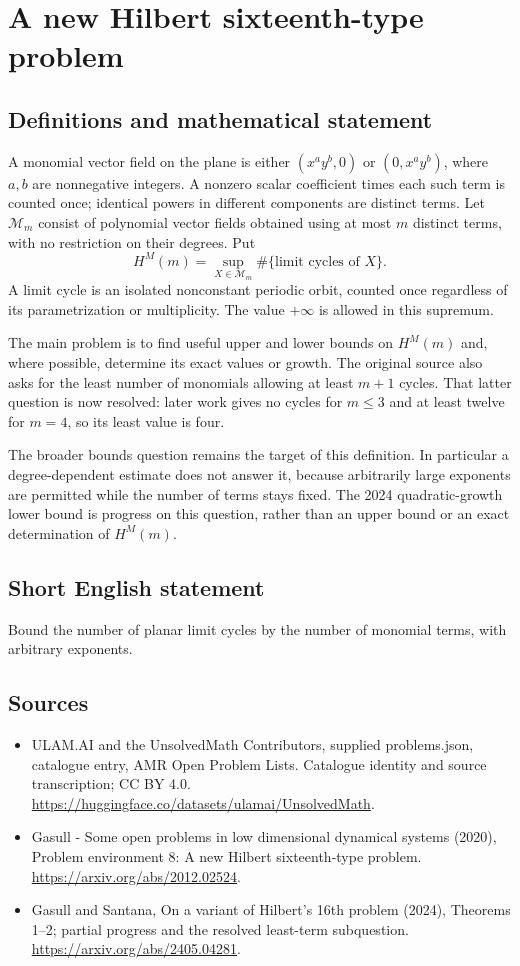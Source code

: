 \documentclass[11pt,a4paper]{article}
\begin{document}
\section*{A new Hilbert sixteenth-type problem}\label{statement}

\subsection{Definitions and mathematical statement}
A monomial vector field on the plane is either $(x^ay^b,0)$ or
$(0,x^ay^b)$, where $a,b$ are nonnegative integers. A nonzero scalar
coefficient times each such term is counted once; identical powers in
different components are distinct terms. Let $\mathcal M_m$ consist of
polynomial vector fields obtained using at most $m$ distinct terms, with no
restriction on their degrees. Put
\[
 H^M(m)=\sup_{X\in\mathcal M_m}\#\{\text{limit cycles of }X\}.
\]
A limit cycle is an isolated nonconstant periodic orbit, counted once
regardless of its parametrization or multiplicity. The value $+\infty$ is
allowed in this supremum.

The main problem is to find useful upper and lower bounds on $H^M(m)$ and,
where possible, determine its exact values or growth. The original source
also asks for the least number of monomials allowing at least $m+1$ cycles.
That latter question is now resolved: later work gives no cycles for
$m\le3$ and at least twelve for $m=4$, so its least value is four.

The broader bounds question remains the target of this definition. In
particular a degree-dependent estimate does not answer it, because arbitrarily
large exponents are permitted while the number of terms stays fixed. The
2024 quadratic-growth lower bound is progress on this question, rather than
an upper bound or an exact determination of $H^M(m)$.
\subsection{Short English statement}
Bound the number of planar limit cycles by the number of monomial terms, with arbitrary exponents.
\subsection{Sources}
\begin{itemize}
\item[S1] ULAM.AI and the UnsolvedMath Contributors, supplied problems.json, catalogue entry, AMR Open Problem Lists. Catalogue identity and source transcription; CC BY 4.0.
\url{https://huggingface.co/datasets/ulamai/UnsolvedMath}.
\item[S2] Gasull - Some open problems in low dimensional dynamical systems (2020), Problem environment 8: A new Hilbert sixteenth-type problem. 
\url{https://arxiv.org/abs/2012.02524}.
\item[S3] Gasull and Santana, On a variant of Hilbert’s 16th problem (2024), Theorems 1–2; partial progress and the resolved least-term subquestion.
\url{https://arxiv.org/abs/2405.04281}.
\end{itemize}
\end{document}
